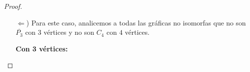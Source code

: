 \documentclass{article}
\begin{document}
\begin{enumerate}
\begin{proof}
\begin{itemize}
\begin{itemize}
            \item[$\cdot\cdot$)] Si $G$ es \textit{escendible completa}, entonces
              $\overline{P_3}$ es subgr\'afica inducida de $G$.
              Supongamos, sin pérdida de generalidad, que $y_0 \in S$.
              Entonces: $y_1 \in S$ (pues $y_0 y_1 \notin E_G$).
              Luego, $y_2 \in S$!! (pues $y_1 y_2 \notin E_G$). Pero no todos los $y_i$'s
              pueden estar en $S$.
              Si $y_0 \in K$, entonces $y_1 \in S$ o $y_1 \in K$ implican que $y_0$ es
              adyacente a $y_1$!!
              Pero $y_0 y_1 \notin E_G$ y he aqu\'i una contradicci\'on de suponer a
              $\overline{P_3}$
              como subgr\'afica inducida de $G$.
              Por tanto, se concluye que $\overline{P_3}$ no est\'a contenida como
              subgr\'afica inducida en $G$.
          \end{itemize}

        \item[$\Leftarrow$)] Para este caso, analicemos a todas las gr\'aficas no isomorfas
          que no son $\overline{P_3}$ con $3$ v\'ertices y no son $C_4$ con $4$ v\'ertices.

          \textbf{Con 3 v\'ertices:}

          \begin{figure}[ht!]
            \centering
\end{figure}
\end{itemize}
\end{proof}
\end{enumerate}
\end{document}
